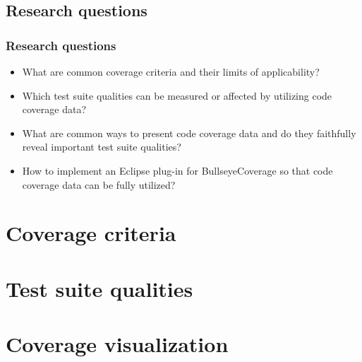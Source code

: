 \documentclass{beamer}
\begin{document}
\subsection{Research questions}

\begin{frame}
  \frametitle{Research questions}
\begin{itemize}
  \item What are common coverage criteria and their limits of applicability?
  \pause
  \item Which test suite qualities can be measured or affected by utilizing code coverage data?
  \pause
  \item What are common ways to present code coverage data and do they faithfully reveal
important test suite qualities?
  \pause
  \item How to implement an Eclipse plug-in for BullseyeCoverage so that code coverage data
can be fully utilized?
\end{itemize}
\end{frame}


\section{Coverage criteria}


\section{Test suite qualities}


\section{Coverage visualization}
\end{document}
